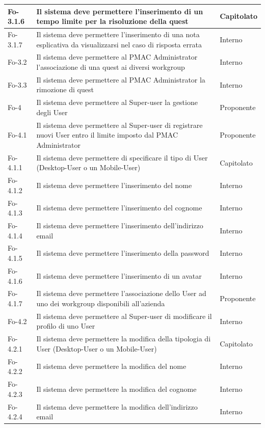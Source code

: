 \documentclass[10pt,a4paper]{article}
\begin{document}
\begin{longtable}{|p{}|p{}|p{}|}
\hline
Fo-3.1.6 & Il sistema deve permettere l'inserimento di un tempo limite per la risoluzione della quest & Capitolato\\
\hline
Fo-3.1.7 & Il sistema deve permettere l'inserimento di una nota esplicativa da visualizzarsi nel caso di risposta errata & Interno\\
\hline
Fo-3.2 & Il sistema deve permettere al PMAC Administrator l'associazione di una quest ai diversi workgroup & Interno\\
\hline
Fo-3.3 & Il sistema deve permettere al PMAC Administrator la rimozione di quest & Interno\\
\hline
Fo-4 & Il sistema deve permettere al Super-user la gestione degli User & Proponente\\
\hline
Fo-4.1 & Il sistema deve permettere al Super-user di registrare nuovi User entro il limite imposto dal PMAC Administrator & Proponente\\
\hline
Fo-4.1.1 & Il sistema deve permettere di specificare il tipo di User (Desktop-User o un Mobile-User) & Capitolato\\
\hline
Fo-4.1.2 & Il sistema deve permettere l'inserimento del nome & Interno\\
\hline
Fo-4.1.3 & Il sistema deve permettere l'inserimento del cognome & Interno\\
\hline
Fo-4.1.4 & Il sistema deve permettere l'inserimento dell'indirizzo email & Interno\\
\hline
Fo-4.1.5 & Il sistema deve permettere l'inserimento della password & Interno\\
\hline
Fo-4.1.6 & Il sistema deve permettere l'inserimento di un avatar & Interno\\
\hline
Fo-4.1.7 & Il sistema deve permettere l'associazione dello User ad uno dei workgroup disponibili all'azienda & Proponente\\
\hline
Fo-4.2 & Il sistema deve permettere al Super-user di modificare il profilo di uno User & Interno\\
\hline
Fo-4.2.1 & Il sistema deve permettere la modifica della tipologia di User (Desktop-User o un Mobile-User) & Capitolato\\
\hline
Fo-4.2.2 & Il sistema deve permettere la modifica del nome & Interno\\
\hline
Fo-4.2.3 & Il sistema deve permettere la modifica del cognome & Interno\\
\hline
Fo-4.2.4 & Il sistema deve permettere la modifica dell'indirizzo email & Interno\\

\end{longtable}
\end{document}
